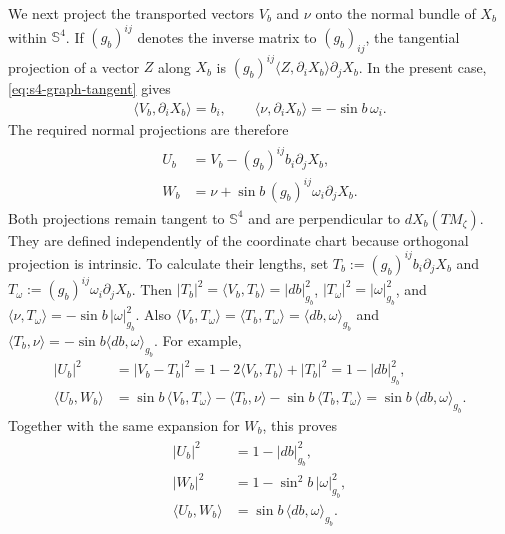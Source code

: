 \documentclass[a4paper,11pt,oneside,reqno]{amsart}
\numberwithin{equation}{section}
\theoremstyle{definition}
\begin{document}
We next project the transported vectors $V_b$ and $\nu$
onto the normal bundle of $X_b$ within $\mathbb S^4$.
If $(g_b)^{ij}$ denotes the inverse matrix to $(g_b)_{ij}$,
the tangential projection of a vector $Z$ along $X_b$ is
$ (g_b)^{ij}\langle Z,\partial_iX_b\rangle\partial_jX_b$.
In the present case, \eqref{eq:s4-graph-tangent} gives
%
\begin{align*}
    \langle V_b,\partial_iX_b\rangle=b_i,
    \qquad
    \langle\nu,\partial_iX_b\rangle=-\sin b\,\omega_i.
\end{align*}
%
The required normal projections are therefore
%
\begin{align}
    \label{eq:s4-testing-projections}
    \begin{split}
        U_b&=V_b-(g_b)^{ij}b_i\partial_jX_b,\\
        W_b&=\nu+\sin b\,(g_b)^{ij}\omega_i\partial_jX_b.
    \end{split}
\end{align}
%
Both projections remain tangent to $\mathbb S^4$ and are
perpendicular to $dX_b(TM_\zeta)$. They are defined
independently of the coordinate chart because orthogonal
projection is intrinsic. To calculate their lengths, set
$T_b:=(g_b)^{ij}b_i\partial_jX_b$ and
$T_\omega:=(g_b)^{ij}\omega_i\partial_jX_b$.
Then
$|T_b|^2=\langle V_b,T_b\rangle=|db|_{g_b}^2$,
$|T_\omega|^2=|\omega|_{g_b}^2$, and
$\langle\nu,T_\omega\rangle=-\sin b\,|\omega|_{g_b}^2$.
Also
$\langle V_b,T_\omega\rangle
=\langle T_b,T_\omega\rangle=\langle db,\omega\rangle_{g_b}$
and
$\langle T_b,\nu\rangle=-\sin b\langle db,\omega\rangle_{g_b}$.
For example,
%
\begin{align*}
    |U_b|^2
    &=|V_b-T_b|^2
      =1-2\langle V_b,T_b\rangle+|T_b|^2
      =1-|db|_{g_b}^2,\\
    \langle U_b,W_b\rangle
    &=\sin b\,\langle V_b,T_\omega\rangle
      -\langle T_b,\nu\rangle
      -\sin b\,\langle T_b,T_\omega\rangle=\sin b\,\langle db,\omega\rangle_{g_b}.
\end{align*}
%
Together with the same expansion for $W_b$, this proves
%
\begin{align}
    \label{eq:s4-testing-lengths}
    \begin{split}
        |U_b|^2&=1-|db|_{g_b}^2,\\
        |W_b|^2&=1-\sin^2b\,|\omega|_{g_b}^2,\\
        \langle U_b,W_b\rangle
        &=\sin b\,\langle db,\omega\rangle_{g_b}.
    \end{split}
\end{align}
\end{document}
